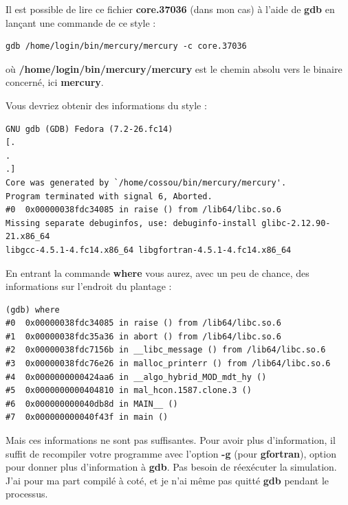 \documentclass[a4paper,twoside]{article}
\begin{document}
Il est possible de lire ce fichier \textbf{core.37036} (dans mon cas) à l'aide de \textbf{gdb} en lançant une commande de ce style :
\begin{verbatim}
gdb /home/login/bin/mercury/mercury -c core.37036 
\end{verbatim}
où \textbf{/home/login/bin/mercury/mercury} est le chemin absolu vers le binaire concerné, ici \textbf{mercury}.

Vous devriez obtenir des informations du style :
\begin{verbatim}
GNU gdb (GDB) Fedora (7.2-26.fc14)
[.
.
.]
Core was generated by `/home/cossou/bin/mercury/mercury'.
Program terminated with signal 6, Aborted.
#0  0x00000038fdc34085 in raise () from /lib64/libc.so.6
Missing separate debuginfos, use: debuginfo-install glibc-2.12.90-21.x86_64 
libgcc-4.5.1-4.fc14.x86_64 libgfortran-4.5.1-4.fc14.x86_64
\end{verbatim}

En entrant la commande \textbf{where} vous aurez, avec un peu de chance, des informations sur l'endroit du plantage :
\begin{verbatim}
(gdb) where
#0  0x00000038fdc34085 in raise () from /lib64/libc.so.6
#1  0x00000038fdc35a36 in abort () from /lib64/libc.so.6
#2  0x00000038fdc7156b in __libc_message () from /lib64/libc.so.6
#3  0x00000038fdc76e26 in malloc_printerr () from /lib64/libc.so.6
#4  0x0000000000424aa6 in __algo_hybrid_MOD_mdt_hy ()
#5  0x0000000000404810 in mal_hcon.1587.clone.3 ()
#6  0x000000000040db8d in MAIN__ ()
#7  0x000000000040f43f in main ()
\end{verbatim}

Mais ces informations ne sont pas suffisantes. Pour avoir plus d'information, il suffit de recompiler votre programme avec l'option \textbf{-g} (pour \textbf{gfortran}), option pour donner plus d'information à \textbf{gdb}. Pas besoin de réexécuter la simulation. J'ai pour ma part compilé à coté, et je n'ai même pas quitté \textbf{gdb} pendant le processus. 
\end{document}
